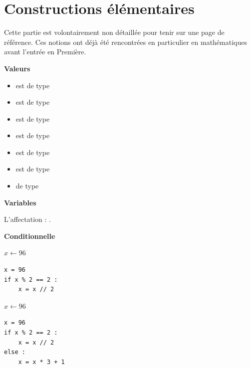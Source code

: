 \chapter{Constructions élémentaires}

Cette partie est volontairement non détaillée pour tenir sur une page de référence. Ces notions ont déjà été rencontrées en particulier en mathématiques avant l'entrée en Première.

\begin{multicols}{2}

{\bfseries Valeurs}

\begin{itemize}
	\item {} est de type 
	\item {} est de type 
	\item {} est de type 
	\item {} est de type 
	\item \pythoninline{[1, 2]} est de type 
	\item {} est de type 
	\item {}  de type 
\end{itemize}

\medskip
{\bfseries Variables}

L'affectation  : .


\medskip
{\bfseries Conditionnelle}

\begin{algorithm}[H]
$x \leftarrow 96$\;
\end{algorithm}

\vspace{-1ex}
\begin{verbatim}
x = 96
if x % 2 == 2 :
    x = x // 2
\end{verbatim}

\begin{algorithm}[H]
$x \leftarrow 96$\;
\end{algorithm}

\vspace{-1ex}
\begin{verbatim}
x = 96
if x % 2 == 2 :
    x = x // 2
else :
    x = x * 3 + 1
\end{verbatim}


\end{multicols}
